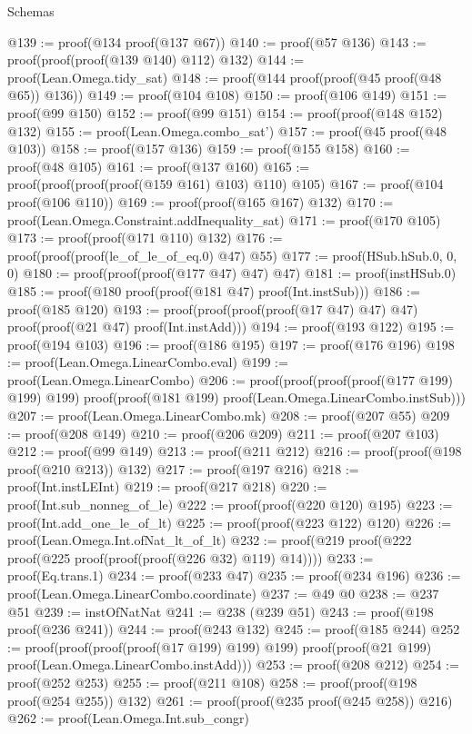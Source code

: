 \begin{lexlean}{Schemas}
\begin{coremodule}
@139 := proof(@134 proof(@137 @67))
@140 := proof(@57 @136)
@143 := proof(proof(proof(@139 @140) @112) @132)
@144 := proof(Lean.Omega.tidy_sat)
@148 := proof(@144 proof(proof(@45 proof(@48 @65)) @136))
@149 := proof(@104 @108)
@150 := proof(@106 @149)
@151 := proof(@99 @150)
@152 := proof(@99 @151)
@154 := proof(proof(@148 @152) @132)
@155 := proof(Lean.Omega.combo_sat')
@157 := proof(@45 proof(@48 @103))
@158 := proof(@157 @136)
@159 := proof(@155 @158)
@160 := proof(@48 @105)
@161 := proof(@137 @160)
@165 := proof(proof(proof(proof(@159 @161) @103) @110) @105)
@167 := proof(@104 proof(@106 @110))
@169 := proof(proof(@165 @167) @132)
@170 := proof(Lean.Omega.Constraint.addInequality_sat)
@171 := proof(@170 @105)
@173 := proof(proof(@171 @110) @132)
@176 := proof(proof(proof(le_of_le_of_eq.{0}) @47) @55)
@177 := proof(HSub.hSub.{0, 0, 0})
@180 := proof(proof(proof(@177 @47) @47) @47)
@181 := proof(instHSub.{0})
@185 := proof(@180 proof(proof(@181 @47) proof(Int.instSub)))
@186 := proof(@185 @120)
@193 := proof(proof(proof(proof(@17 @47) @47) @47) proof(proof(@21 @47) proof(Int.instAdd)))
@194 := proof(@193 @122)
@195 := proof(@194 @103)
@196 := proof(@186 @195)
@197 := proof(@176 @196)
@198 := proof(Lean.Omega.LinearCombo.eval)
@199 := proof(Lean.Omega.LinearCombo)
@206 := proof(proof(proof(proof(@177 @199) @199) @199)
      proof(proof(@181 @199) proof(Lean.Omega.LinearCombo.instSub)))
@207 := proof(Lean.Omega.LinearCombo.mk)
@208 := proof(@207 @55)
@209 := proof(@208 @149)
@210 := proof(@206 @209)
@211 := proof(@207 @103)
@212 := proof(@99 @149)
@213 := proof(@211 @212)
@216 := proof(proof(@198 proof(@210 @213)) @132)
@217 := proof(@197 @216)
@218 := proof(Int.instLEInt)
@219 := proof(@217 @218)
@220 := proof(Int.sub_nonneg_of_le)
@222 := proof(proof(@220 @120) @195)
@223 := proof(Int.add_one_le_of_lt)
@225 := proof(proof(@223 @122) @120)
@226 := proof(Lean.Omega.Int.ofNat_lt_of_lt)
@232 := proof(@219 proof(@222 proof(@225 proof(proof(proof(@226 @32) @119) @14))))
@233 := proof(Eq.trans.{1})
@234 := proof(@233 @47)
@235 := proof(@234 @196)
@236 := proof(Lean.Omega.LinearCombo.coordinate)
@237 := @49 @0
@238 := @237 @51
@239 := instOfNatNat
@241 := @238 (@239 @51)
@243 := proof(@198 proof(@236 @241))
@244 := proof(@243 @132)
@245 := proof(@185 @244)
@252 := proof(proof(proof(proof(@17 @199) @199) @199)
      proof(proof(@21 @199) proof(Lean.Omega.LinearCombo.instAdd)))
@253 := proof(@208 @212)
@254 := proof(@252 @253)
@255 := proof(@211 @108)
@258 := proof(proof(@198 proof(@254 @255)) @132)
@261 := proof(proof(@235 proof(@245 @258)) @216)
@262 := proof(Lean.Omega.Int.sub_congr)

\end{coremodule}
\end{lexlean}
